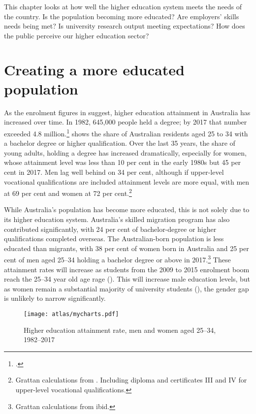 \documentclass{grattan}
\begin{document}
This chapter looks at how well the higher education system meets the needs of the country. Is the population becoming more educated? Are employers' skills needs being met? Is university research output meeting expectations? How does the public perceive our higher education sector?

%
\section{Creating a more educated population}\label{sec:creating-a-more-educated-population}

As the enrolment figures in  suggest, higher education attainment in Australia has increased over time. In 1982, 645,000 people held a degree; by 2017 that number exceeded 4.8 million.\footcite[][]{ABS2017educationandwork}  shows the share of Australian residents aged 25 to 34 with a bachelor degree or higher qualification. Over the last 35 years, the share of young adults, holding a degree has increased dramatically, especially for women, whose attainment level was less than 10 per cent in the early 1980s but 45 per cent in 2017. Men lag well behind on 34 per cent, although if upper-level vocational qualifications are included attainment levels are more equal, with men at 69 per cent and women at 72 per cent.\footnote{Grattan calculations from \textcite[][]{ABS2017microdataeducatio}. Including diploma and certificates III and IV for upper-level vocational qualifications.}

While Australia's population has become more educated, this is not solely due to its higher education system. Australia's skilled migration program has also contributed significantly, with 24 per cent of bachelor-degree or higher qualifications completed overseas. The Australian-born population is less educated than migrants, with 38 per cent of women born in Australia and 25 per cent of men aged 25--34 holding a bachelor degree or above in 2017.\footnote{Grattan calculations from ibid.} These attainment rates will increase as students from the 2009 to 2015 enrolment boom reach the 25--34 year old age rage (). This will increase male education levels, but as women remain a substantial majority of university students (), the gender gap is unlikely to narrow significantly.

    \begin{figure} %
    \caption{Higher education attainment rate, men and women aged 25--34, 1982--2017}\label{fig:higher-education-attainment-rate-men-and-women-aged-2534-19822017}
    \texttt{[image: atlas/mycharts.pdf]}
    \end{figure}
\end{document}
